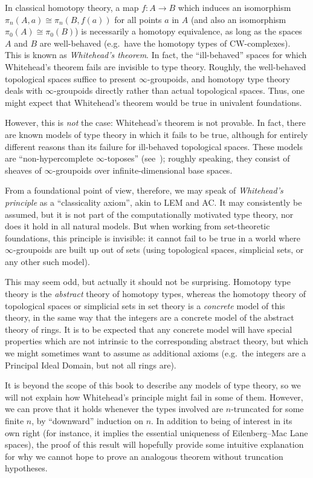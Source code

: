 In classical homotopy theory, a map $f:A\to B$ which induces an isomorphism $\pi_n(A,a) \cong \pi_n(B,f(a))$ for all points $a$ in $A$ (and also an isomorphism $\pi_0(A)\cong\pi_0(B)$) is necessarily a homotopy equivalence, as long as the spaces $A$ and $B$ are well-behaved (e.g.\ have the homotopy types of CW-complexes).
This is known as \emph{Whitehead's theorem}.
In fact, the ``ill-behaved'' spaces for which Whitehead's theorem fails are invisible to type theory.
Roughly, the well-behaved topological spaces suffice to present $\infty$-groupoids, and homotopy type theory deals with $\infty$-groupoids directly rather than actual topological spaces.
Thus, one might expect that Whitehead's theorem would be true in univalent foundations.

However, this is \emph{not} the case: Whitehead's theorem is not provable.
In fact, there are known models of type theory in which it fails to be true, although for entirely different reasons than its failure for ill-behaved topological spaces.
These models are ``non-hypercomplete $\infty$-toposes'' (see~\cite{lurie:higher-topoi}); roughly speaking, they consist of sheaves of $\infty$-groupoids over infinite-dimensional base spaces.

From a foundational point of view, therefore, we may speak of \emph{Whitehead's principle} as a ``classicality axiom'', akin to LEM and AC.
It may consistently be assumed, but it is not part of the computationally motivated type theory, nor does it hold in all natural models.
But when working from set-theoretic foundations, this principle is invisible: it cannot fail to be true in a world where $\infty$-groupoids are built up out of sets (using topological spaces, simplicial sets, or any other such model).

This may seem odd, but actually it should not be surprising.
Homotopy type theory is the \emph{abstract} theory of homotopy types, whereas the homotopy theory of topological spaces or simplicial sets in set theory is a \emph{concrete} model of this theory, in the same way that the integers are a concrete model of the abstract theory of rings.
It is to be expected that any concrete model will have special properties which are not intrinsic to the corresponding abstract theory, but which we might sometimes want to assume as additional axioms (e.g.\ the integers are a Principal Ideal Domain, but not all rings are).

It is beyond the scope of this book to describe any models of type theory, so we will not explain how Whitehead's principle might fail in some of them.
However, we can prove that it holds whenever the types involved are $n$-truncated for some finite $n$, by ``downward'' induction on $n$.
In addition to being of interest in its own right (for instance, it implies the essential uniqueness of Eilenberg--Mac Lane spaces), the proof of this result will hopefully provide some intuitive explanation for why we cannot hope to prove an analogous theorem without truncation hypotheses.

